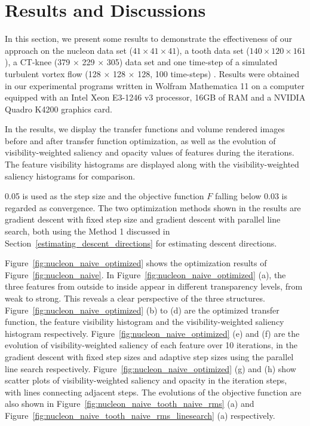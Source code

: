 \section{Results and Discussions}
In this section, we present some results to demonstrate the effectiveness of our approach on the nucleon data set ($ 41 \times 41 \times 41 $), a tooth data set ($ 140 \times 120 \times 161 $), a CT-knee (379 $ \times $ 229 $ \times $ 305) data set \cite{website:Roettger_volume_2013} and one time-step of a simulated turbulent vortex flow (128 $\times$ 128 $\times$ 128, 100 time-steps) \cite{website:Ma_repository_2013}.
Results were obtained in our experimental programs written in Wolfram Mathematica 11 on a computer equipped with an Intel Xeon E3-1246 v3 processor, 16GB of RAM and a NVIDIA Quadro K4200 graphics card.

In the results, we display the transfer functions and volume rendered images before and after transfer function optimization, as well as the evolution of visibility-weighted saliency and opacity values of features during the iterations.
The feature visibility histograms \cite{wang_efficient_2011} are displayed along with the visibility-weighted saliency histograms for comparison.

0.05 is used as the step size and the objective function $ F $ falling below 0.03 is regarded as convergence.
The two optimization methods shown in the results are gradient descent with fixed step size and gradient descent with parallel line search, both using the Method 1 discussed in Section~\ref{estimating_descent_directions} for estimating descent directions.

Figure~\ref{fig:nucleon_naive_optimized} shows the optimization results of Figure~\ref{fig:nucleon_naive}. In Figure~\ref{fig:nucleon_naive_optimized} (a), the three features from outside to inside appear in different transparency levels, from weak to strong. This reveals a clear perspective of the three structures.
Figure~\ref{fig:nucleon_naive_optimized} (b) to (d) are the optimized transfer function, the feature visibility histogram and the visibility-weighted saliency histogram respectively.
Figure~\ref{fig:nucleon_naive_optimized} (e) and (f) are the evolution of visibility-weighted saliency of each feature over 10 iterations, in the gradient descent with fixed step sizes and adaptive step sizes using the parallel line search respectively. Figure~\ref{fig:nucleon_naive_optimized} (g) and (h) show scatter plots of visibility-weighted saliency and opacity in the iteration steps, with lines connecting adjacent steps.
The evolutions of the objective function are also shown in Figure~\ref{fig:nucleon_naive_tooth_naive_rms} (a) and Figure~\ref{fig:nucleon_naive_tooth_naive_rms_linesearch} (a) respectively.

